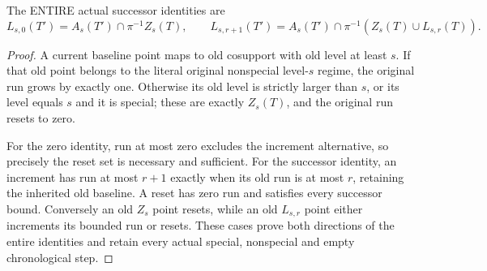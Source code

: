 \begin{lemma}
\label{hir:original-step-one-history-year-whole-step-dictionaries}
\leanok
{}
The ENTIRE actual successor identities are
\[
 L_{s,0}(T')=A_s(T')\cap\pi^{-1}Z_s(T),\qquad
 L_{s,r+1}(T')=A_s(T')\cap\pi^{-1}(Z_s(T)\cup L_{s,r}(T)).
\]
\end{lemma}
\begin{proof}
A current baseline point maps to old cosupport with old level at least $s$.
If that old point belongs to the literal original nonspecial level-$s$
regime, the original run grows by exactly one. Otherwise its old level
is strictly larger than $s$, or its level equals $s$ and it is special;
these are exactly $Z_s(T)$, and the original run resets to zero.

For the zero identity, run at most zero excludes the increment alternative,
so precisely the reset set is necessary and sufficient. For the successor
identity, an increment has run at most $r+1$ exactly when its old run is
at most $r$, retaining the inherited old baseline. A reset has zero run
and satisfies every successor bound. Conversely an old $Z_s$ point
resets, while an old $L_{s,r}$ point either increments its bounded run or
resets. These cases prove both directions of the entire identities and
retain every actual special, nonspecial and empty chronological step.
\end{proof}

